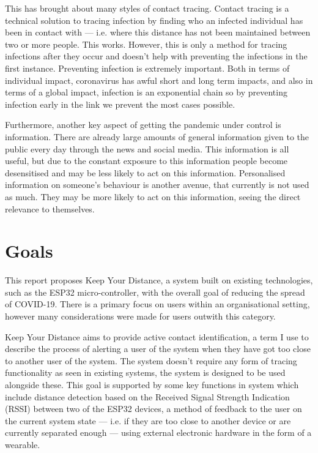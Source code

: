 \documentclass{l4proj}
\begin{document}
This has brought about many styles of contact tracing. Contact tracing is a technical solution to tracing infection by finding who an infected individual has been in contact with — i.e. where this distance has not been maintained between two or more people. This works. However, this is only a method for tracing infections after they occur and doesn't help with preventing the infections in the first instance. Preventing infection is extremely important. Both in terms of individual impact, coronavirus has awful short and long term impacts, and also in terms of a global impact, infection is an exponential chain so by preventing infection early in the link we prevent the most cases possible.

Furthermore, another key aspect of getting the pandemic under control is information. There are already large amounts of general information given to the public every day through the news and social media. This information is all useful, but due to the constant exposure to this information people become desensitised \citep{koh_messaging_2020} and may be less likely to act on this information. Personalised information on someone's behaviour is another avenue, that currently is not used as much. They may be more likely to act on this information, seeing the direct relevance to themselves.

\section{Goals}

This report proposes Keep Your Distance, a system built on existing technologies, such as the ESP32 micro-controller, with the overall goal of reducing the spread of COVID-19. There is a primary focus on users within an organisational setting, however many considerations were made for users outwith this category.

Keep Your Distance aims to provide active contact identification, a term I use to describe the process of alerting a user of the system when they have got too close to another user of the system. The system doesn't require any form of tracing functionality as seen in existing systems, the system is designed to be used alongside these. This goal is supported by some key functions in system which include distance detection based on the Received Signal Strength Indication (RSSI) between two of the ESP32 devices, a method of feedback to the user on the current system state — i.e. if they are too close to another device or are currently separated enough — using external electronic hardware in the form of a wearable.
\end{document}
